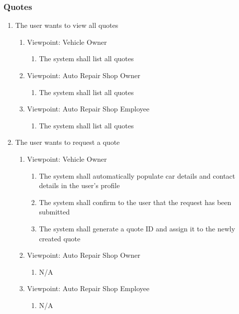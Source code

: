 \documentclass[12pt]{article}
\begin{document}
\subsubsection{Quotes}
\begin{enumerate}[resume*=business_events]
	\item The user wants to view all quotes
	      \begin{enumerate}[VP\arabic*.]
		      \item Viewpoint: Vehicle Owner
		            \begin{enumerate}
			            \item The system shall list all quotes
		            \end{enumerate}
		      \item Viewpoint: Auto Repair Shop Owner
		            \begin{enumerate}
			            \item The system shall list all quotes
		            \end{enumerate}
		      \item Viewpoint: Auto Repair Shop Employee
		            \begin{enumerate}
			            \item The system shall list all quotes
		            \end{enumerate}
	      \end{enumerate}

	\item The user wants to request a quote
	      \begin{enumerate}[VP\arabic*.]
		      \item Viewpoint: Vehicle Owner
		            \begin{enumerate}
			            \item The system shall automatically populate car details and contact details in the user's profile
			            \item The system shall confirm to the user that the request has been submitted
			            \item The system shall generate a quote ID and assign it to the newly created quote
		            \end{enumerate}
		      \item Viewpoint: Auto Repair Shop Owner
		            \begin{enumerate}
			            \item[] N/A
		            \end{enumerate}
		      \item Viewpoint: Auto Repair Shop Employee
		            \begin{enumerate}
			            \item[] N/A
		            \end{enumerate}
	      \end{enumerate}


\end{enumerate}
\end{document}
